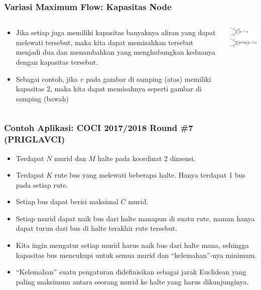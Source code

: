 \begin{frame}
\frametitle{Variasi Maximum Flow: Kapasitas Node}
\begin{minipage}[\textheight]{\textwidth}
\begin{columns}[T]
\begin{column}{0.6\textwidth}
\begin{itemize}[]
  \item Jika setiap \fnode juga memiliki kapasitas banyaknya aliran yang dapat melewati \fnode tersebut, maka kita dapat memisahkan \fnode tersebut menjadi dua \fnode dan menambahkan \fedge yang menghubungkan keduanya dengan kapasitas \fnode tersebut.
  \item Sebagai contoh, jika \fnode $v$ pada gambar di samping (atas) memiliki kapasitas $2$, maka kita dapat memisahnya seperti gambar di samping (bawah)
\end{itemize}
\end{column}
\begin{column}{0.4\textwidth}
\includegraphics[width=4.5cm]{asset/node-capacity.png}
\end{column}
\end{columns}
\end{minipage}
\end{frame}

\begin{frame}
\frametitle{Contoh Aplikasi: COCI 2017/2018 Round \#7 (PRIGLAVCI)}
\begin{itemize}
  \item Terdapat $N$ murid dan $M$ halte pada koordinat 2 dimensi.
  \item Terdapat $K$ rute bus yang melewati beberapa halte. Hanya terdapat 1 bus pada setiap rute.
  \item Setiap bus dapat berisi maksimal $C$ murid.
  \item Setiap murid dapat naik bus dari halte manapun di suatu rute, namun hanya dapat turun dari bus di halte terakhir rute tersebut.
  \item Kita ingin mengatur setiap murid harus naik bus dari halte mana, sehingga kapasitas bus mencukupi untuk semua murid dan ``kelemahan''-nya minimum.
  \item ``Kelemahan'' suatu pengaturan didefinisikan sebagai jarak Euclidean yang paling maksimum antara seorang murid ke halte yang harus dikunjunginya.
\end{itemize}
\end{frame}


